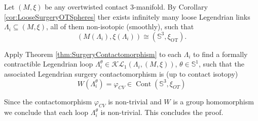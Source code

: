 \documentclass[11pt]{amsart}
\theoremstyle{plain}
\theoremstyle{definition}
\theoremstyle{remark}
\numberwithin{theorem}{section}
\newcommand{\NS}{{\mathbb{S}}}
\newcommand{\KL}{\mathcal{KL}}
\newcommand{\Cont}{\operatorname{Cont}}
\newcommand{\OT}{\operatorname{OT}}
\begin{document}
Let $(M,\xi)$ be any overtwisted contact $3$-manifold. By Corollary \ref{cor:LooseSurgeryOTSpheres} ther exists infinitely many loose Legendrian links $\Lambda_i\subseteq (M,\xi)$, all of them non-isotopic (smoothly), such that 
$$ (M(\Lambda_i),\xi(\Lambda_i))\cong(\NS^3,\xi_{\OT}). $$

Apply Theorem \ref{thm:SurgeryContactomorphism}  to each $\Lambda_i$ to find a formally contractible Legendrian loop $\Lambda_i^\theta\in \KL_1(\Lambda_i,(M,\xi))$, $\theta\in \NS^1$, such that the associated Legendrian surgery contactomorphism is (up to contact isotopy)
$$ W(\Lambda_i^\theta)=\varphi_{CV}\in \Cont(\NS^3,\xi_{OT})$$

Since the contactomorphism $\varphi_{CV}$ is non-trivial and $W$ is a group homomorphism we conclude that each loop $\Lambda_i^\theta$ is non-trivial. This concludes the proof.


















\end{document}
